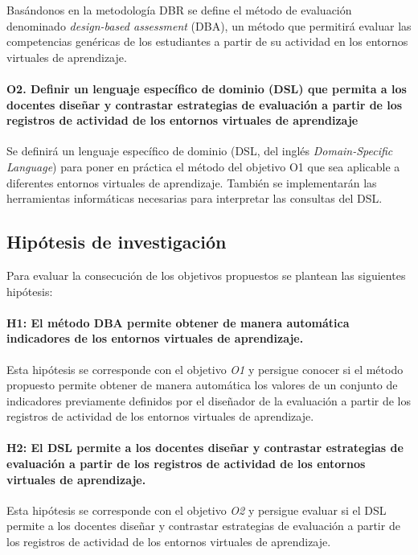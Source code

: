 Basándonos en la metodología DBR se define el método de evaluación denominado \emph{design-based assessment} (DBA), un método que permitirá evaluar las competencias genéricas de los estudiantes a partir de su actividad en los entornos virtuales de aprendizaje.

\paragraph*{O2. Definir un lenguaje específico de dominio (DSL) que permita a los docentes diseñar y contrastar estrategias de evaluación a partir de los registros de actividad de los entornos virtuales de aprendizaje}

Se definirá un lenguaje específico de dominio (DSL, del inglés \emph{Domain-Specific Language}) para poner en práctica el método del objetivo O1 que sea aplicable a diferentes entornos virtuales de aprendizaje. También se implementarán las herramientas informáticas necesarias para interpretar las consultas del DSL.

\subsection*{Hipótesis de investigación}

Para evaluar la consecución de los objetivos propuestos se plantean las siguientes hipótesis:
\paragraph*{H1: El método DBA permite obtener de manera automática indicadores de los entornos virtuales de aprendizaje.}

Esta hipótesis se corresponde con el objetivo \emph{O1} y persigue conocer si el método propuesto permite obtener de manera automática los valores de un conjunto de indicadores previamente definidos por el diseñador de la evaluación a partir de los registros de actividad de los entornos virtuales de aprendizaje.

\paragraph*{H2: El DSL permite a los docentes diseñar y contrastar estrategias de evaluación a partir de los registros de actividad de los entornos virtuales de aprendizaje.}

Esta hipótesis se corresponde con el objetivo \emph{O2} y persigue evaluar si el DSL permite a los docentes diseñar y contrastar estrategias de evaluación a partir de los registros de actividad de los entornos virtuales de aprendizaje.


